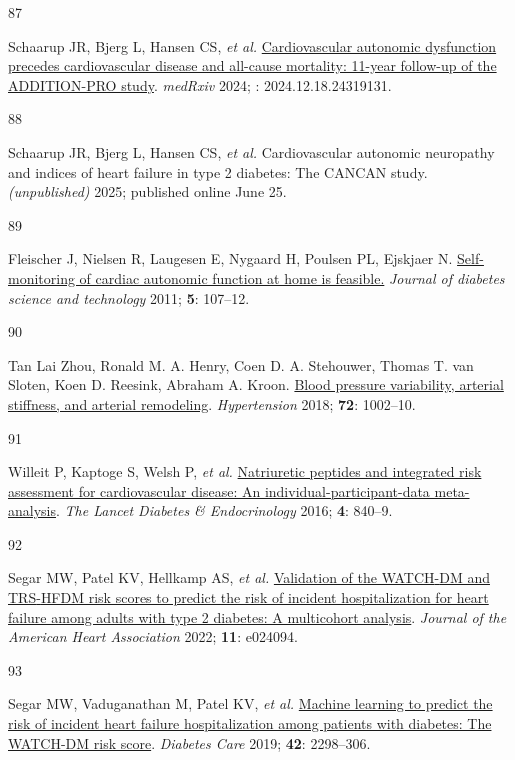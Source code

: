 \documentclass[
  a4paper,
  headsepline=true,
  open=left]{scrbook}
\newlength{\cslhangindent}
\newlength{\csllabelwidth}
\newlength{\cslentryspacingunit} %
\newenvironment{CSLReferences}[2] %
 {%
  \setlength{\parindent}{0pt}
  \ifodd #1
  \let\oldpar\par
  \def\par{\hangindent=\cslhangindent\oldpar}
  \fi
  \setlength{\parskip}{#2\cslentryspacingunit}
 }%
 {}
\newcommand{\CSLLeftMargin}[1]{\parbox[t]{\csllabelwidth}{#1}}
\newcommand{\CSLRightInline}[1]{\parbox[t]{\linewidth - \csllabelwidth}{#1}\break}
\begin{document}
\begin{CSLReferences}{0}{0}
\leavevmode{}%
\CSLLeftMargin{87 }%
\CSLRightInline{Schaarup JR, Bjerg L, Hansen CS, \emph{et al.}
\href{https://doi.org/10.1101/2024.12.18.24319131}{Cardiovascular
autonomic dysfunction precedes cardiovascular disease and all-cause
mortality: 11-year follow-up of the ADDITION-PRO study}. \emph{medRxiv}
2024; : 2024.12.18.24319131.}

\leavevmode{}%
\CSLLeftMargin{88 }%
\CSLRightInline{Schaarup JR, Bjerg L, Hansen CS, \emph{et al.}
Cardiovascular autonomic neuropathy and indices of heart failure in type
2 diabetes: The CANCAN study. \emph{(unpublished)} 2025; published
online June 25.}

\leavevmode{}%
\CSLLeftMargin{89 }%
\CSLRightInline{Fleischer J, Nielsen R, Laugesen E, Nygaard H, Poulsen
PL, Ejskjaer N.
\href{https://doi.org/10.1177/193229681100500115}{Self-monitoring of
cardiac autonomic function at home is feasible.} \emph{Journal of
diabetes science and technology} 2011; \textbf{5}: 107--12.}

\leavevmode{}%
\CSLLeftMargin{90 }%
\CSLRightInline{Tan Lai Zhou, Ronald M. A. Henry, Coen D. A. Stehouwer,
Thomas T. van Sloten, Koen D. Reesink, Abraham A. Kroon.
\href{https://doi.org/doi:10.1161/HYPERTENSIONAHA.118.11325}{Blood
pressure variability, arterial stiffness, and arterial remodeling}.
\emph{Hypertension} 2018; \textbf{72}: 1002--10.}

\leavevmode{}%
\CSLLeftMargin{91 }%
\CSLRightInline{Willeit P, Kaptoge S, Welsh P, \emph{et al.}
\href{https://doi.org/10.1016/S2213-8587(16)30196-6}{Natriuretic
peptides and integrated risk assessment for cardiovascular disease: An
individual-participant-data meta-analysis}. \emph{The Lancet Diabetes \&
Endocrinology} 2016; \textbf{4}: 840--9.}

\leavevmode{}%
\CSLLeftMargin{92 }%
\CSLRightInline{Segar MW, Patel KV, Hellkamp AS, \emph{et al.}
\href{https://doi.org/10.1161/JAHA.121.024094}{Validation of the
WATCH{-}DM and TRS{-}HFDM risk scores to predict the risk of incident
hospitalization for heart failure among adults with type 2 diabetes: A
multicohort analysis}. \emph{Journal of the American Heart Association}
2022; \textbf{11}: e024094.}

\leavevmode{}%
\CSLLeftMargin{93 }%
\CSLRightInline{Segar MW, Vaduganathan M, Patel KV, \emph{et al.}
\href{https://doi.org/10.2337/dc19-0587}{Machine learning to predict the
risk of incident heart failure hospitalization among patients with
diabetes: The WATCH-DM risk score}. \emph{Diabetes Care} 2019;
\textbf{42}: 2298--306.}


\end{CSLReferences}
\end{document}
